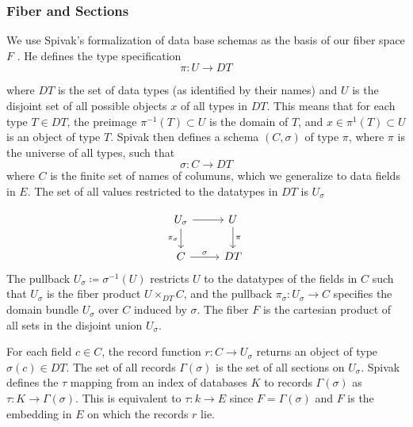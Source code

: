 \documentclass[../main.tex]{subfiles}
\begin{document}
\subsubsection{Fiber and Sections}
\label{sec:data_fiber}
We use Spivak's formalization of data base schemas as the basis of our fiber space $F$ \cite{spivakSIMPLICIALDATABASES}. He defines the type specification 
\begin{equation}
\pi: U \rightarrow DT
\end{equation}

where $DT$ is the set of data types (as identified by their names) and $U$ is the disjoint set of all possible objects $x$ of all types in $DT$. This means that for each type $T\in DT$, the preimage $\pi^{-1}(T)\subset U $ is the domain of $T$, and $x \in \pi^{1}(T)\subset U$ is an object of type $T$. Spivak then defines a schema $(C, \sigma)$ of type $\pi$, where $\pi$ is the universe of all types, such that 
\begin{equation}
\sigma: C \rightarrow DT
\end{equation}
where $C$ is the finite set of names of columuns, which we generalize to data fields in $E$. The set of all values restricted to the datatypes in $DT$ is $U_{\sigma}$

\begin{equation}
    \begin{tikzcd}
        U_{\sigma} \arrow[d, "\pi_{\sigma}"'] \arrow[r] & U \arrow[d, "\pi"] \\
        C \arrow[r, "\sigma"]                           & DT                
    \end{tikzcd}
\end{equation}
The pullback $U_{\sigma} \coloneqq \sigma^{-1}(U)$ restricts $U$ to the datatypes of the fields in $C$ such that $U_{\sigma}$ is the fiber product $U \times_{DT} C$, and the pullback $\pi_{\sigma}:U_{\sigma} \rightarrow C$ specifies the domain bundle $U_{\sigma}$ over $C$ induced by $\sigma$. The fiber $F$ is the cartesian product of all sets in the disjoint union $U_{\sigma}$. 

For each field $c \in C$, the record function $r: C \rightarrow U_{\sigma}$ returns an object of type $\sigma(c) \in DT$. The set of all records $\Gamma(\sigma)$ is the set of all sections on $U_\sigma$. Spivak defines the $\tau$ mapping from an index of databases $K$ to records $\Gamma(\sigma)$ as $\tau: K \rightarrow \Gamma(\sigma)$. This is equivalent to $\tau: k \rightarrow E$ since $F = \Gamma(\sigma)$ and $F$ is the embedding in $E$ on which the records $r$ lie.
 
\end{document}
